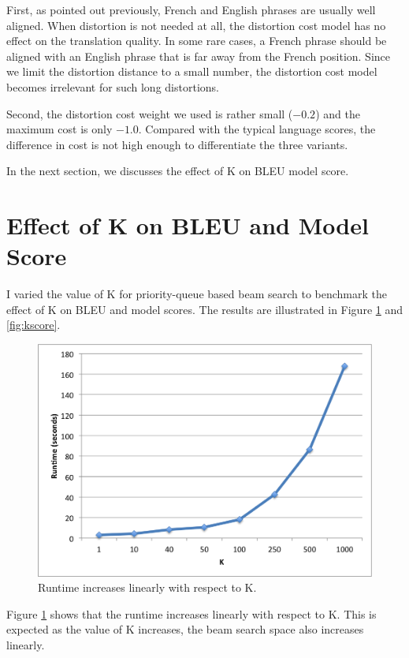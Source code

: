 \documentclass[12pt]{article}   %
\begin{document}
First, as pointed out previously, French and English phrases are usually well aligned. When distortion is not needed at all, the distortion cost model has no effect on the translation quality. In some rare cases, a French phrase should be aligned with an English phrase that is far away from the French position. Since we limit the distortion distance to a small number, the distortion cost model becomes irrelevant for such long distortions.

Second, the distortion cost weight we used is rather small ($-0.2$) and the maximum cost is only $-1.0$. Compared with the typical language scores, the difference in cost is not high enough to differentiate the three variants.

In the next section, we discusses the effect of K on BLEU model score.




\section{Effect of K on BLEU and Model Score}
\label{sec:k}
I varied the value of K for priority-queue based beam search to benchmark the effect of K on BLEU and model scores. The results are illustrated in Figure \ref{fig:kruntime} and \ref{fig:kscore}. 

\begin{figure}[h*]
	\centering
	\includegraphics[width=12cm]{k-runtime}
	\caption{Runtime increases linearly with respect to K.}
	\label{fig:kruntime}
\end{figure}

Figure \ref{fig:kruntime} shows that the runtime increases linearly with respect to K. This is expected as the value of K increases, the beam search space also increases linearly.
\end{document}
